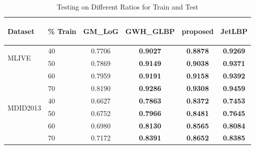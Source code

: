 \documentclass{article}
\begin{document}
\begin{table}
\scriptsize
\caption{Testing on Different Ratios for Train and Test}
\label{tbl:portion}
\begin{tabular}{||l|l||cccc||}
\toprule
\toprule
\begin{turn}{-90}\textbf{Dataset}\end{turn}&\begin{turn}{-90}\textbf{\% Train}\end{turn}&\begin{turn}{-90}\textbf{GM\_LoG}\end{turn}&\begin{turn}{-90}\textbf{GWH\_GLBP}\end{turn}&\begin{turn}{-90}\textbf{proposed}\end{turn}&\begin{turn}{-90}\textbf{JetLBP}\end{turn}\\
\midrule
\midrule
\multirow{4}{*}{\begin{turn}{-90}MLIVE\end{turn}}&40&0.7706&\textcolor[rgb]{0,0,1}{\textbf{0.9027}}&\textbf{0.8878}&\textcolor[rgb]{1,0,0}{\textbf{0.9269}}\\
\cmidrule{2-6}
&50&0.7869&\textcolor[rgb]{0,0,1}{\textbf{0.9149}}&\textbf{0.9038}&\textcolor[rgb]{1,0,0}{\textbf{0.9371}}\\
\cmidrule{2-6}
&60&0.7959&\textcolor[rgb]{0,0,1}{\textbf{0.9191}}&\textbf{0.9158}&\textcolor[rgb]{1,0,0}{\textbf{0.9392}}\\
\cmidrule{2-6}
&70&0.8190&\textbf{0.9286}&\textcolor[rgb]{0,0,1}{\textbf{0.9308}}&\textcolor[rgb]{1,0,0}{\textbf{0.9459}}\\
\midrule \midrule
\multirow{4}{*}{\begin{turn}{-90}MDID2013\end{turn}}&40&0.6627&\textcolor[rgb]{0,0,1}{\textbf{0.7863}}&\textcolor[rgb]{1,0,0}{\textbf{0.8372}}&\textbf{0.7453}\\
\cmidrule{2-6}
&50&0.6752&\textcolor[rgb]{0,0,1}{\textbf{0.7966}}&\textcolor[rgb]{1,0,0}{\textbf{0.8481}}&\textbf{0.7645}\\
\cmidrule{2-6}
&60&0.6980&\textcolor[rgb]{0,0,1}{\textbf{0.8130}}&\textcolor[rgb]{1,0,0}{\textbf{0.8565}}&\textbf{0.8084}\\
\cmidrule{2-6}
&70&0.7172&\textcolor[rgb]{0,0,1}{\textbf{0.8391}}&\textcolor[rgb]{1,0,0}{\textbf{0.8652}}&\textbf{0.8385}\\

\end{tabular}
\end{table}
\end{document}
